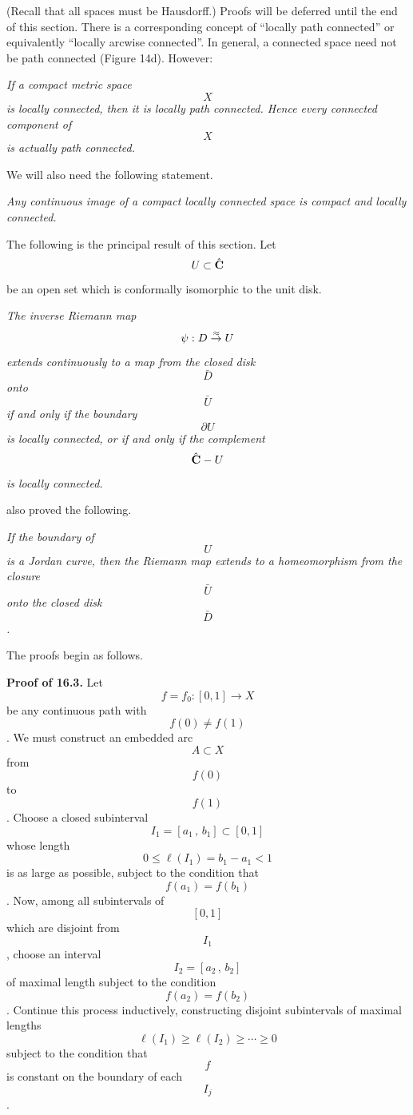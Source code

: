 \noindent (Recall that all spaces must be Hausdorff.)
Proofs will be deferred until the end of this section.
There is a corresponding concept of {\bit ``locally path connected''} or
equivalently {\bit ``locally arcwise connected''}.
In general, a connected space need not be path connected (Figure 14d). However:

{ {\it If a compact metric space \[X\] is locally
connected, then it is locally path connected. Hence every connected
component of \[X\] is actually path connected.}\medskip}

\noindent We will also need the following statement.

{ {\it Any continuous image of a compact locally
connected space is compact and locally connected.}\medskip}

\noindent The following is the principal result of this section. Let \[U\subset
\hat{{\bf C}}\] be an open set which is conformally isomorphic to the unit disk.
\eject

{ {\it The inverse Riemann map
\[\psi:D\buildrel
\approx\over\to U\] extends continuously to a map from the
closed disk \[\bar D\] onto \[\bar U\] if and only if the boundary \[\partial
U\] is locally connected, or if and only if the complement \[\hat{{\bf C}}-U\]
is locally connected.}\medskip}

\noindent \caratheodory also proved the following.

{ {\it If the boundary of \[U\] is a Jordan curve, then
the Riemann map extends to a homeomorphism from the closure \[\bar U\]
onto the closed disk \[\bar D\].}\bigskip}

\noindent The proofs begin as follows.\smallskip

{\bf Proof of 16.3.} Let \[f=f_0:[0,1]\to X\] be any continuous path with\break
\[f(0)\ne f(1)\]. We must construct an embedded arc \[A\subset X\] from
\[f(0)\] to \[f(1)\].
Choose a closed subinterval \[I_1=[a_1\,,\,b_1]\subset [0,1]\] whose
length \[0\le\ell(I_1)=b_1-a_1<1\] is as large as possible, subject to the
condition that \[f(a_1)=f(b_1)\]. Now,
among all subintervals of \[[0,1]\] which are disjoint from \[I_1\],
choose an interval \[I_2=[a_2\,,\,b_2]\]  of maximal length subject to
the condition \[f(a_2)=f(b_2)\].
Continue this process inductively, constructing disjoint subintervals
of maximal lengths \[\;\ell(I_1)\ge\ell(I_2)\ge\cdots\ge 0\;\] subject to
the condition that \[f\]
is constant on the boundary of each \[ I_j\].

